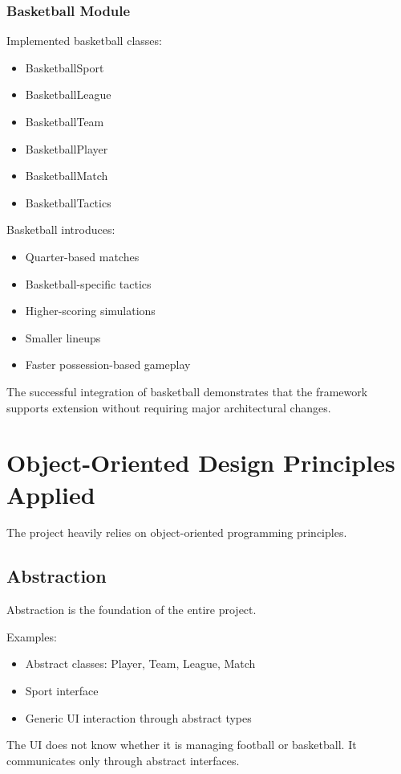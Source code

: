 \documentclass[11pt,a4paper]{article}
\begin{document}
\subsubsection*{Basketball Module}

Implemented basketball classes:
\begin{itemize}
\item BasketballSport
\item BasketballLeague
\item BasketballTeam
\item BasketballPlayer
\item BasketballMatch
\item BasketballTactics
\end{itemize}

Basketball introduces:
\begin{itemize}
\item Quarter-based matches
\item Basketball-specific tactics
\item Higher-scoring simulations
\item Smaller lineups
\item Faster possession-based gameplay
\end{itemize}

The successful integration of basketball demonstrates that the framework supports extension without requiring major architectural changes.

\section{Object-Oriented Design Principles Applied}

The project heavily relies on object-oriented programming principles.

\subsection{Abstraction}

Abstraction is the foundation of the entire project.

Examples:
\begin{itemize}
\item Abstract classes: Player, Team, League, Match
\item Sport interface
\item Generic UI interaction through abstract types
\end{itemize}

The UI does not know whether it is managing football or basketball. It communicates only through abstract interfaces.
\end{document}
